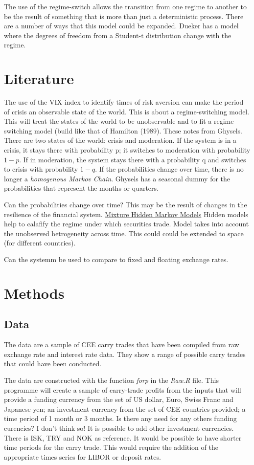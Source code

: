 \documentclass[12pt, a4paper, oneside]{article} %
\begin{document}
The use of the regime-switch allows the transition from one regime to another to be the result of something that is more than just a deterministic process. There are a number of ways that this model could be expanded.  Dueker has a model where the degrees of freedom from a Student-t distribution change with the regime.  

\section{Literature}
The use of the VIX index to identify times of risk aversion can make the period of crisis an observable state of the world. This is about a regime-switching model. This will treat the states of the world to be unobservable and to fit a regime-switching model (build like that of Hamilton (1989).  These notes from Ghysels.  There are two states of the world:  crisis and moderation.  If the system is in a crisis, it stays there with probability p; it switches to moderation with probability $1-p$.  If in moderation, the system stays there with a probability q and switches to crisis with probability $1-q$.  If the probabilities change over time, there is no longer a \emph{homogenous Markov Chain}. Ghysels has a seasonal dummy for the probabilities that represent the months or quarters.  

Can the probabilities change over time?  This may be the result of changes in the resilience of the financial system. 
\href{http://members.home.nl/jeroenvermunt/dias2010.pdf}{Mixture Hidden Markov Models} Hidden models help to calafify the regime under which securities trade. Model takes into account the unobserved hetrogeneity across time. This could could be extended to space (for different countries).  

Can the systemm be used to compare to fixed and floating exchange rates. 

\section{Methods}
\subsection{Data}
The data are a sample of CEE carry trades that have been compiled from raw exchange rate and interest rate data.  They show a range of possible carry trades that could have been conducted. 

The data are constructed with the function \emph{forp} in the \emph{Raw.R} file. This programme will create a sample of carry-trade profits from the inputs that will provide a funding currency from the set of US dollar, Euro, Swiss Franc and Japanese yen; an investment currency from the set of CEE countries provided; a time period of 1 month or 3 months.  Is there any need for any others funding curencies?  I don't think so!   It is possible to add other investment currencies.  There is ISK, TRY and NOK as reference.  It would be possible to have shorter time periods for the carry trade.   This would require the addition of the appropriate times series for LIBOR or deposit rates.  
\end{document}

